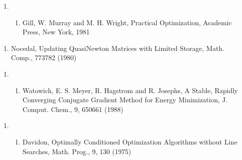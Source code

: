 \documentclass[letterpaper,11pt,english]{sphinxmanual}
\begin{document}
\begin{enumerate}
%
\setcounter{enumi}{15}
\item {} \begin{enumerate}
%
\setcounter{enumii}{4}
\item {} 
Gill, W. Murray and M. H. Wright, Practical Optimization, Academic Press, New York, 1981

\end{enumerate}

\end{enumerate}
\begin{enumerate}
%
\setcounter{enumi}{9}
\item {} 
Nocedal, Updating Quasi\sphinxhyphen{}Newton Matrices with Limited Storage, Math. Comp., 773\sphinxhyphen{}782 (1980)

\end{enumerate}
\begin{enumerate}
%
\setcounter{enumi}{18}
\item {} \begin{enumerate}
%
\setcounter{enumii}{9}
\item {} 
Watowich, E. S. Meyer, R. Hagstrom and R. Josephs, A Stable, Rapidly Converging Conjugate Gradient Method for Energy Minimization, J. Comput. Chem., 9, 650\sphinxhyphen{}661 (1988)

\end{enumerate}

\end{enumerate}
\begin{enumerate}
%
\setcounter{enumi}{22}
\item {} \begin{enumerate}
%
\setcounter{enumii}{2}
\item {} 
Davidon, Optimally Conditioned Optimization Algorithms without Line Searches, Math. Prog., 9, 1\sphinxhyphen{}30 (1975)

\end{enumerate}

\end{enumerate}
\end{document}
